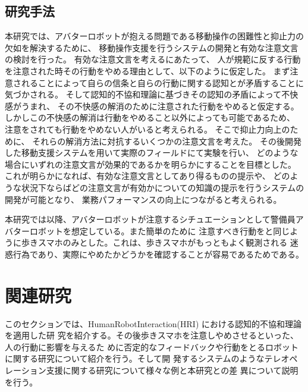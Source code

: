 \documentclass{kuisthesis}
\begin{document}
\subsection{研究手法}
\label{sec: 研究目的}
本研究では、アバターロボットが抱える問題である移動操作の困難性と抑止力の欠如を解決するために、
移動操作支援を行うシステムの開発と有効な注意文言の検討を行った。
有効な注意文言を考えるにあたって、
人が規範に反する行動を注意された時その行動をやめる理由として、以下のように仮定した。
まず注意されることによって自らの信条と自らの行動に関する認知とが矛盾することに気づかされる。
そして認知的不協和理論\cite{Festinger1957}に基づきその認知の矛盾によって不快感がうまれ、
その不快感の解消のために注意された行動をやめると仮定する。
しかしこの不快感の解消は行動をやめること以外によっても可能であるため、
注意をされても行動をやめない人がいると考えられる。
そこで抑止力向上のために、
それらの解消方法に対抗するいくつかの注意文言を考えた。
その後開発した移動支援システムを用いて実際のフィールドにて実験を行い、
どのような場合にいずれの注意文言が効果的であるかを明らかにすることを目標とした。
これが明らかになれば、有効な注意文言としてあり得るものの提示や、
どのような状況下ならばどの注意文言が有効かについての知識の提示を行うシステムの開発が可能となり、
業務パフォーマンスの向上につながると考えられる。


本研究では以降、アバターロボットが注意するシチュエーションとして警備員アバターロボットを想定している。また簡単のために
注意すべき行動を\cite{Schneider2022,Mizumaru2019}と同じように歩きスマホのみとした。これは、歩きスマホがもっともよく観測される
迷惑行為であり、実際にやめたかどうかを確認することが容易であるためである。



\section{関連研究}
このセクションでは、HumanRobotInteraction(HRI) における認知的不協和理論を適用した研
究を紹介する。その後歩きスマホを注意しやめさせるといった、人の行動に影響を与えるた
めに否定的なフィードバックや行動をとるロボットに関する研究について紹介を行う。そして開
発するシステムのようなテレオペレーション支援に関する研究について様々な例と本研究との差
異について説明を行う。
\end{document}
